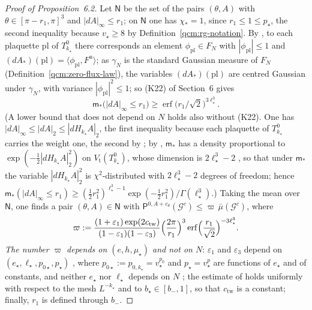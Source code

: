 \documentclass[11pt,letterpaper,reqno]{amsart}
\theoremstyle{definition}
\begin{document}
\begin{proof}[Proof of Proposition~6.2]
Let $\mathsf N$ be the set of the pairs $(\theta,A)$ with $\theta\in[\pi-r_1,\pi]^3$ and $|dA|_\infty\le r_1$;
on $\mathsf N$ one has $\chi_*=1$, since $r_1\le1\le p_\star$, the second inequality because $v_\star\ge8$ by Definition~\ref{qcm:rg-notation}.
By \cite[Proposition~22.1]{QEDConstruction}, to each plaquette $\mathrm{pl}$ of $T^0_{k_\star}$ there corresponds an element $\phi_{\mathrm{pl}}\in F_N$ with $|\phi_{\mathrm{pl}}|\le1$ and $(dA_*)(\mathrm{pl})=\allowbreak \langle\phi_{\mathrm{pl}},\allowbreak F^{\mathrm u}\rangle$;
as $\gamma_N$ is the standard Gaussian measure of $F_N$ (Definition~\ref{qcm:zero-flux-law}), the variables $(dA_*)(\mathrm{pl})$ are centred Gaussian under $\gamma_N$, with variance $|\phi_{\mathrm{pl}}|^2\le1$;
so (K22) of Section~6 gives
\begin{equation*}
\mathsf m_*\bigl(|dA|_\infty\le r_1\bigr)\ge\operatorname{erf}\bigl(r_1/\sqrt2\bigr)^{3\ell_\star^3}.
\end{equation*}
(A lower bound that does not depend on $N$ holds also without (K22).
One has $|dA|_\infty\le|dA|_2\le|dH_{k_\star}A|_2$, the first inequality because each plaquette of $T^0_{k_\star}$ carries the weight one, the second by \cite[equation~(10.2)]{QEDConstruction};
by \cite[Proposition~22.1]{QEDConstruction}, $\mathsf m_*$ has a density proportional to $\exp(-\frac12|dH_{k_\star}A|_2^2)$ on $V_{\mathrm t}(T^0_{k_\star})$, whose dimension is $2\ell_\star^3-2$ \cite[Section~22.1]{QEDConstruction}, so that under $\mathsf m_*$ the variable $|dH_{k_\star}A|_2^2$ is $\chi^2$-distributed with $2\ell_\star^3-2$ degrees of freedom;
hence $\mathsf m_*(|dA|_\infty\le r_1)\ge(\frac12r_1^2)^{\ell_\star^3-1}\exp(-\frac12r_1^2)/\Gamma(\ell_\star^3)$.)
Taking the mean over $\mathsf N$, one finds a pair $(\theta,A)\in\mathsf N$ with $\mathsf P^{0,A+c_\theta}(\mathcal G^c)\le\varpi\,\allowbreak \bar\mu(\mathcal G^c)$, where
\begin{equation*}
\varpi:=\frac{(1+\varepsilon_1)\exp(2c_{\mathrm{tw}})}{(1-\varepsilon_1)(1-\varepsilon_3)}\Bigl(\frac{2\pi}{r_1}\Bigr)^3\operatorname{erf}\Bigl(\frac{r_1}{\sqrt2}\Bigr)^{-3\ell_\star^3}.
\end{equation*}
\emph{The number $\varpi$ depends on $(e,h,\mu_\star)$ and not on $N$}:
$\varepsilon_1$ and $\varepsilon_3$ depend on $(e_\star,\ell_\star,p_{0\star},p_\star)$ \cite[Section~22.3, equation~(22.15)]{QEDConstruction}, where $p_{0\star}:=p_{0,k_\star}=v_\star^{p_0}$ and $p_\star=v_\star^{p}$ are functions of $e_\star$ and of constants, and neither $e_\star$ nor $\ell_\star$ depends on $N$ \cite[Proposition~16.1 and Sections~15--16]{QEDConstruction};
the estimate of \cite[Propositions~22.4--22.5]{QEDConstruction} holds uniformly with respect to the mesh $L^{-k_\star}$ and to $b_\star\in[b_-,1]$, so that $c_{\mathrm{tw}}$ is a constant;
finally, $r_1$ is defined through $b_-$.


\end{proof}
\end{document}
